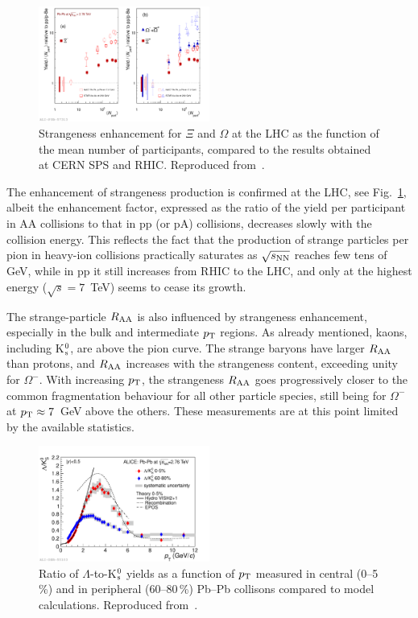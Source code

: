 \begin{figure}
\centering
\includegraphics[width=0.5\textwidth]{ksfigures/StrangenessEnhancemet.pdf}
\caption{Strangeness enhancement for $\Xi$ and $\Omega$ at the LHC as the function of the mean number of participants, compared to the results obtained at CERN SPS and RHIC. Reproduced from~\cite{ABELEV:2013zaa}.}
\label{figks:StrangeEnhancement}
\end{figure}


The enhancement of strangeness production is confirmed at the LHC, see Fig.~\ref{figks:StrangeEnhancement}, albeit the enhancement factor, expressed as the ratio of the yield per participant in AA collisions to that in pp (or pA) collisions, decreases slowly with the collision energy. This reflects the fact that the production of strange particles per pion in heavy-ion collisions practically saturates as $\sqrt{s_{\rm NN}}$ reaches few tens of GeV, while in pp it still increases from RHIC to the LHC, and only at the highest energy ($\sqrt{s} = 7$~TeV) seems to cease its growth.

The strange-particle $R_{\rm AA}$ is also influenced by strangeness enhancement, especially in the bulk and intermediate $p_{\rm T}$ regions. As already mentioned, kaons, including K$_{\rm s}^0$, are above the pion curve. The strange baryons have larger $R_{\rm AA}$ than protons, and $R_{\rm AA}$ increases with the strangeness content, exceeding unity for $\Omega^-$. With increasing $p_{\rm T}$, the strangeness $R_{\rm AA}$ goes progressively closer to the common fragmentation behaviour for all other particle species, still being for $\Omega^-$ at $p_{\rm T} \approx 7$~GeV above the others. These measurements are at this point limited by the available statistics.

\begin{figure}
\centering
\includegraphics[width=0.5\textwidth]{ksfigures/LambdaToK0T.pdf}
\caption{Ratio of $\Lambda$-to-K$_{\rm s}^0$ yields as a function of $p_{\rm T}$ measured in central (0--5\,\%) and in peripheral (60--80\,\%) Pb--Pb collisons compared to model calculations. Reproduced from~\cite{Abelev:2013xaa}.}
\label{figks:LambdaToK}
\end{figure}


